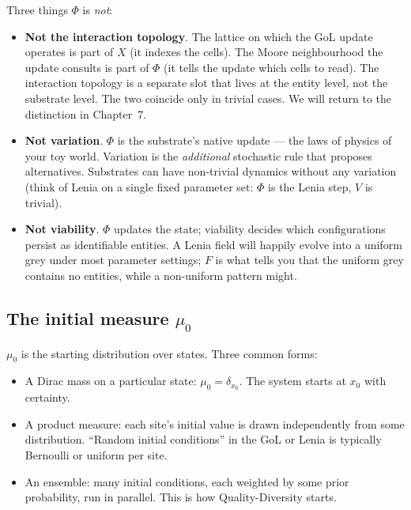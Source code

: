 Three things $\Phi$ is \emph{not}:

\begin{itemize}[leftmargin=1.5em,itemsep=2pt]
  \item \textbf{Not the interaction topology}. The lattice on which the
    GoL update operates is part of $X$ (it indexes the cells). The
    Moore neighbourhood the update consults is part of $\Phi$ (it
    tells the update which cells to read). The interaction topology
    is a separate slot that lives at the entity level, not the
    substrate level. The two coincide only in trivial cases. We will
    return to the distinction in Chapter~7.
  \item \textbf{Not variation}. $\Phi$ is the substrate's native update
    --- the laws of physics of your toy world. Variation is the
    \emph{additional} stochastic rule that proposes alternatives.
    Substrates can have non-trivial dynamics without any variation
    (think of Lenia on a single fixed parameter set: $\Phi$ is the
    Lenia step, $V$ is trivial).
  \item \textbf{Not viability}. $\Phi$ updates the state; viability
    decides which configurations persist as identifiable entities. A
    Lenia field will happily evolve into a uniform grey under most
    parameter settings; $F$ is what tells you that the uniform grey
    contains no entities, while a non-uniform pattern might.
\end{itemize}

\subsection*{The initial measure $\mu_0$}

$\mu_0$ is the starting distribution over states. Three common forms:

\begin{itemize}[leftmargin=1.5em,itemsep=2pt]
  \item A Dirac mass on a particular state: $\mu_0 = \delta_{x_0}$. The
    system starts at $x_0$ with certainty.
  \item A product measure: each site's initial value is drawn
    independently from some distribution. ``Random initial
    conditions'' in the GoL or Lenia is typically Bernoulli or uniform
    per site.
  \item An ensemble: many initial conditions, each weighted by some
    prior probability, run in parallel. This is how
    Quality-Diversity starts.
\end{itemize}

